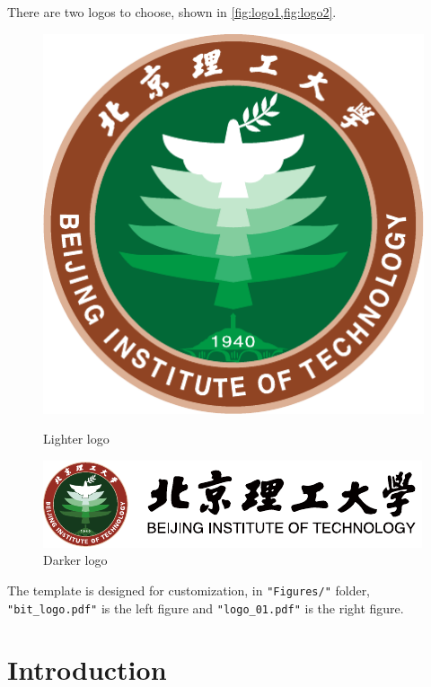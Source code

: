 \documentclass[12pt,english,openany,a4paper]{book}
\begin{document}
	There are two logos to choose, shown in \cref{fig:logo1,fig:logo2}. 
	\begin{figure}[ht]
		\centering
		\begin{minipage}[c]{0.4\linewidth}
			\includegraphics[width=0.9\linewidth]{Figures/bit_logo.pdf}
			\caption{Lighter logo}
			\label{fig:logo1}
		\end{minipage}
		\hspace{1.4cm}
		\begin{minipage}[c]{0.4\linewidth}
			\includegraphics[width=0.9\linewidth]{Figures/logo_01.pdf}
			\caption{Darker logo}
			\label{fig:logo2}
		\end{minipage}%
	\end{figure}
	
	The template is designed for customization, in \texttt{"Figures/"} folder, \texttt{"bit\_logo.pdf"} is the left figure and \texttt{"logo\_01.pdf"} is the right figure.
	
	\chapter{Introduction}\label{chapt:intro}
	
\end{document}
